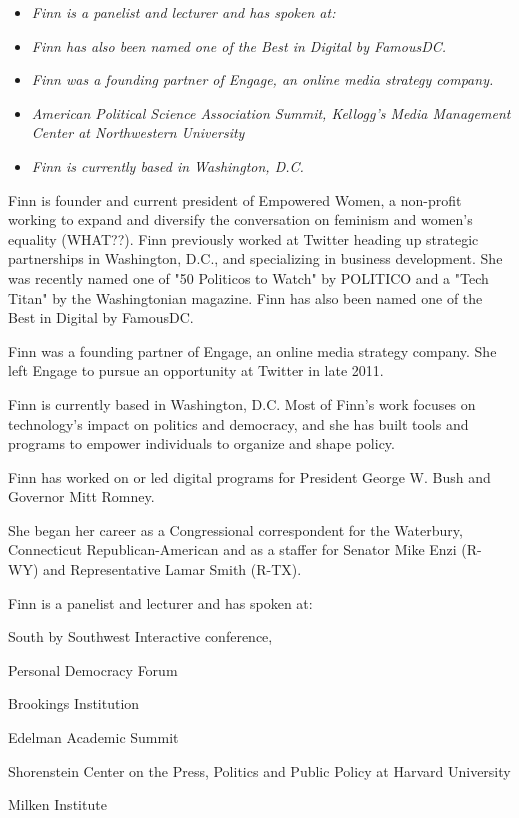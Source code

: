 \begin{itemize}
\item
  \emph{Finn is a panelist and lecturer and has spoken at:}
\item
  \emph{Finn has also been named one of the Best in Digital by
  FamousDC.}
\item
  \emph{Finn was a founding partner of Engage, an online media strategy
  company.}
\item
  \emph{American Political Science Association Summit, Kellogg's Media
  Management Center at Northwestern University}
\item
  \emph{Finn is currently based in Washington, D.C.}
\end{itemize}

Finn is founder and current president of Empowered Women, a non-profit
working to expand and diversify the conversation on feminism and women's
equality (WHAT??). Finn previously worked at Twitter heading up
strategic partnerships in Washington, D.C., and specializing in business
development. She was recently named one of "50 Politicos to Watch" by
POLITICO and a "Tech Titan" by the Washingtonian magazine. Finn has also
been named one of the Best in Digital by FamousDC.

Finn was a founding partner of Engage, an online media strategy company.
She left Engage to pursue an opportunity at Twitter in late 2011.

Finn is currently based in Washington, D.C. Most of Finn's work focuses
on technology's impact on politics and democracy, and she has built
tools and programs to empower individuals to organize and shape policy.

Finn has worked on or led digital programs for President George W. Bush
and Governor Mitt Romney.

She began her career as a Congressional correspondent for the Waterbury,
Connecticut Republican-American and as a staffer for Senator Mike Enzi
(R-WY) and Representative Lamar Smith (R-TX).

Finn is a panelist and lecturer and has spoken at:

South by Southwest Interactive conference,

Personal Democracy Forum

Brookings Institution

Edelman Academic Summit

Shorenstein Center on the Press, Politics and Public Policy at Harvard
University

Milken Institute

